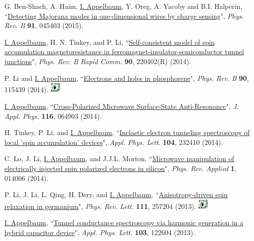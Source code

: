 \documentclass[paper=letter,fontsize=11pt]{scrartcl} %
\newcommand{\PaperEntry}[7]{
		\noindent #1, ``\href{#7}{#2}", \textit{#3} \textbf{#4}, #5 (#6).}
\begin{document}
\begin{etaremune}
\item \PaperEntry{G. Ben-Shach, A. Haim, \underline{I. Appelbaum}, Y. Oreg, A. Yacoby and B.I. Halperin}{Detecting Majorana modes in one-dimensional wires by charge sensing}{Phys. Rev. B}{91}{045403}{2015}{http://dx.doi.org/10.1103/PhysRevB.91.045403}


\item \PaperEntry{\underline{I. Appelbaum}, H. N. Tinkey, and P. Li}{Self-consistent model of spin accumulation magnetoresistance in ferromagnet-insulator-semiconductor tunnel junctions}{Phys. Rev. B Rapid Comm.}{90}{220402(R)}{2014}
{http://dx.doi.org/10.1103/PhysRevB.90.220402}

\item \PaperEntry{P. Li and \underline{I. Appelbaum}}{Electrons and holes in phosphorene}{Phys. Rev. B}{90}{115439}{2014}
{http://dx.doi.org/10.1103/PhysRevB.90.115439} \includegraphics[width=0.2in]{sug.pdf} 

\item \PaperEntry{\underline{I. Appelbaum}}{Cross-Polarized Microwave Surface-State Anti-Resonance}{J. Appl. Phys.}{116}{064903}{2014}{http://dx.doi.org/10.1063/1.4892867}

\item \PaperEntry{H. Tinkey, P. Li, and \underline{I. Appelbaum}}{Inelastic electron tunneling spectroscopy of local 'spin accumulation' devices}{Appl. Phys. Lett.}{104}{232410}{2014}{http://dx.doi.org/10.1063/1.4883638}

\item \PaperEntry{C. Lo, J. Li, \underline{I. Appelbaum}, and J.J.L. Morton}{Microwave manipulation of electrically injected spin polarized electrons in silicon}{Phys. Rev. Applied}{1}{014006}{2014}{http://dx.doi.org/10.1103/PhysRevApplied.1.014006}

\item\PaperEntry
{P. Li, J. Li, L. Qing, H. Dery, and \underline{I. Appelbaum}}{Anisotropy-driven spin relaxation in germanium}{Phys. Rev. Lett.}{111}{257204}{2013}{http://dx.doi.org/10.1103/PhysRevLett.111.257204} \includegraphics[width=0.2in]{sug.pdf} 

\item\PaperEntry
{\underline{I. Appelbaum}}{Tunnel conductance spectroscopy via harmonic generation in a hybrid capacitor device}{Appl. Phys. Lett.}{103}{122604}{2013}{http://dx.doi.org/10.1063/1.4821748}


\end{etaremune}
\end{document}
